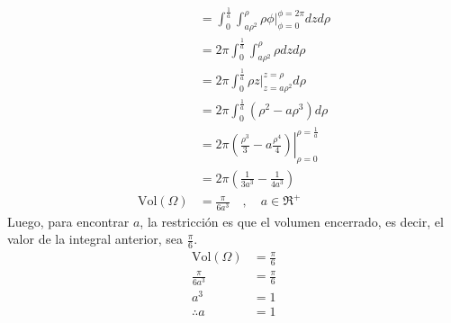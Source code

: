 \begin{solution}
\begin{align*}
        &=\int^{\frac{1}{a}}_{0} \int^{\rho}_{a\rho^2} \rho \left. \phi \right|^{\phi=2\pi}_{\phi=0} dz d\rho \\
        &=2\pi \int^{\frac{1}{a}}_{0} \int^{\rho}_{a\rho^2} \rho dz d\rho \\
        &=2\pi \int^{\frac{1}{a}}_{0} \rho \left.z\right|^{z=\rho}_{z=a\rho^2} d\rho \\
        &=2\pi \int^{\frac{1}{a}}_{0} \left( \rho^2-a\rho^3 \right) d\rho \\
        &=2\pi \left.\left( \frac{\rho^3}{3}-a\frac{\rho^4}{4}\right)\right|^{\rho=\frac{1}{a}}_{\rho=0}\\
        &=2\pi \left(\frac{1}{3a^3}-\frac{1}{4a^3}\right)\\
        \text{Vol}(\Omega)&=\frac{\pi}{6a^3} \quad , \quad a\in \Re^{+}
    \end{align*}
    Luego, para encontrar $a$, la restricción es que el volumen encerrado, es decir, el valor de la integral anterior, sea $\frac{\pi}{6}$.
    \begin{align*}
        \text{Vol}(\Omega)&=\frac{\pi}{6}\\
        \frac{\pi}{6a^3}&=\frac{\pi}{6}\\
        a^3&=1\\
        \therefore a&=1
    \end{align*}

\end{solution}


